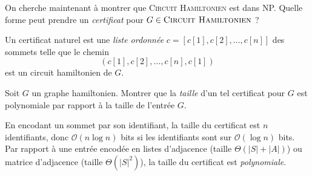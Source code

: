\begin{exercice}[\textsc{Circuit Hamiltonien} est NP-complet%
    \footnote{Vidéo détaillée de la réduction de \textsc{3-SAT} à \textsc{Cycle Hamiltonien} : \url{https://www.youtube.com/watch?v=OHnX-R_SBpM}}]
\begin{correction}
\begin{center}
    \end{center}
  \end{correction}

  
  \begin{question}
  \item On cherche maintenant à montrer que \textsc{Circuit Hamiltonien} est dans NP.
    Quelle forme peut prendre un \emph{certificat} pour $G \in \textsc{Circuit Hamiltonien}$ ?
  \end{question}
  \begin{correction}
    Un certificat naturel est une \emph{liste ordonnée} $c = [c[1], c[2], \dots, c[n]]$ des sommets telle que le chemin
    $$(c[1], c[2], \dots, c[n], c[1])$$
    est un circuit hamiltonien de $G$. 
  \end{correction}

  \begin{question}
  \item Soit $G$ un graphe hamiltonien. Montrer que la \emph{taille} d'un tel certificat pour $G$
    est polynomiale par rapport à la taille de l'entrée $G$.
  \end{question}
  \begin{correction}
    En encodant un sommet par son identifiant, la taille du certificat est $n$ identifiants,
    donc $\mathcal{O}(n\log n)$ bits si les identifiants sont sur $\mathcal{O}(\log n)$ bits.
    Par rapport à une entrée encodée en listes d'adjacence (taille $\Theta(|S| + |A|)$)
    ou matrice d'adjacence (taille $\Theta(|S|^2)$), la taille du certificat est \emph{polynomiale}.
  \end{correction}


\end{exercice}
